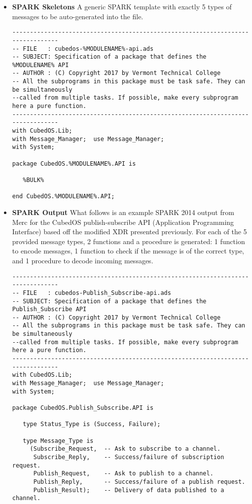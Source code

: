 \begin{itemize}
\item \textbf{SPARK Skeletons} A generic SPARK template with exactly 5 types of messages to be
  auto-generated into the file.
\begin{verbatim}
--------------------------------------------------------------------------------
-- FILE   : cubedos-%MODULENAME%-api.ads
-- SUBJECT: Specification of a package that defines the %MODULENAME% API
-- AUTHOR : (C) Copyright 2017 by Vermont Technical College
-- All the subprograms in this package must be task safe. They can be simultaneously
--called from multiple tasks. If possible, make every subprogram here a pure function.
--------------------------------------------------------------------------------
with CubedOS.Lib;
with Message_Manager;  use Message_Manager;
with System;

package CubedOS.%MODULENAME%.API is

   %BULK%

end CubedOS.%MODULENAME%.API;
\end{verbatim}
  
\item \textbf{SPARK Output} What follows is an example SPARK 2014 output from Merc for the
  CubedOS publish-subscribe API (Application Programming Interface) based off the modified XDR
  presented previously. For each of the 5 provided message types, 2 functions and a procedure is
  generated: 1 function to encode messages, 1 function to check if the message is of the correct
  type, and 1 procedure to decode incoming messages.
\begin{verbatim}
--------------------------------------------------------------------------------
-- FILE   : cubedos-Publish_Subscribe-api.ads
-- SUBJECT: Specification of a package that defines the Publish_Subscribe API
-- AUTHOR : (C) Copyright 2017 by Vermont Technical College
-- All the subprograms in this package must be task safe. They can be simultaneously
--called from multiple tasks. If possible, make every subprogram here a pure function.
--------------------------------------------------------------------------------
with CubedOS.Lib;
with Message_Manager;  use Message_Manager;
with System;

package CubedOS.Publish_Subscribe.API is

   type Status_Type is (Success, Failure);

   type Message_Type is
     (Subscribe_Request,  -- Ask to subscribe to a channel.
      Subscribe_Reply,    -- Success/failure of subscription request.
      Publish_Request,    -- Ask to publish to a channel.
      Publish_Reply,      -- Success/failure of a publish request.
      Publish_Result);    -- Delivery of data published to a channel.


\end{verbatim}
\end{itemize}
